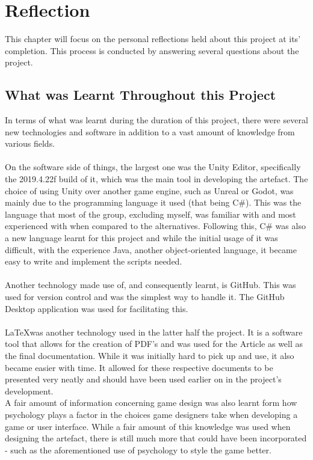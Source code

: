 
\chapter{Reflection} %

\label{Chapter5} %
This chapter will focus on the personal reflections held about this project at its' completion. This process is conducted by answering several questions about the project.

\section{What was Learnt Throughout this Project}
In terms of what was learnt during the duration of this project, there were several new technologies and software in addition to a vast amount of knowledge from various fields.
\\\\
On the software side of things, the largest one was the Unity Editor, specifically the 2019.4.22f build of it, which was the main tool in developing the artefact. The choice of using Unity over another game engine, such as Unreal or Godot, was mainly due to the programming language it used (that being C\#). This was the language that most of the group, excluding myself, was familiar with and most experienced with when compared to the alternatives. Following this, C\# was also a new language learnt for this project and while the initial usage of it was difficult, with the experience  Java, another object-oriented language, it became easy to write and implement the scripts needed. 
\\\\
Another technology made use of, and consequently learnt, is GitHub. This was used for version control and was the simplest way to handle it. The GitHub Desktop application was used for facilitating this. 
\\\\
\LaTeX was another technology used in the latter half the project. It is a software tool that allows for the creation of PDF's and was used for the Article as well as the final documentation. While it was initially hard to pick up and use, it also became easier with time. It allowed for these respective documents to be presented very neatly and should have been used earlier on in the project's development. 
\\
A fair amount of information concerning game design was also learnt form how psychology plays a factor in the choices game designers take when developing a game or user interface. While a fair amount of this knowledge was used when designing the artefact, there is still much more that could have been incorporated - such as the aforementioned use of psychology to style the game better.
